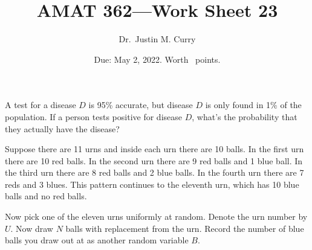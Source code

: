 \documentclass[addpoints,12pt]{exam}
\title{\vspace{-1in} AMAT 362---Work Sheet 23}
\date{Due: May 2, 2022. Worth \numpoints\ points.}
\author{Dr.~Justin M. Curry}
\begin{document}
\maketitle





\begin{questions}

\question[1] A test for a disease $D$ is 95\% accurate, but disease $D$ is only found in 1\% of the population. If a person tests positive for disease $D$, what's the probability that they actually have the disease?

\vspace{1.7in}

\question[5] Suppose there are 11 urns and inside each urn there are 10 balls. In the first urn there are 10 red balls. In the second urn there are 9 red balls and 1 blue ball. In the third urn there are 8 red balls and 2 blue balls. In the fourth urn there are 7 reds and 3 blues. This pattern continues to the eleventh urn, which has 10 blue balls and no red balls.

Now pick one of the eleven urns uniformly at random. Denote the urn number by $U$. Now draw $N$ balls with replacement from the urn. Record the number of blue balls you draw out at as another random variable $B$.

\noaddpoints
{}
\end{questions}
\end{document}
